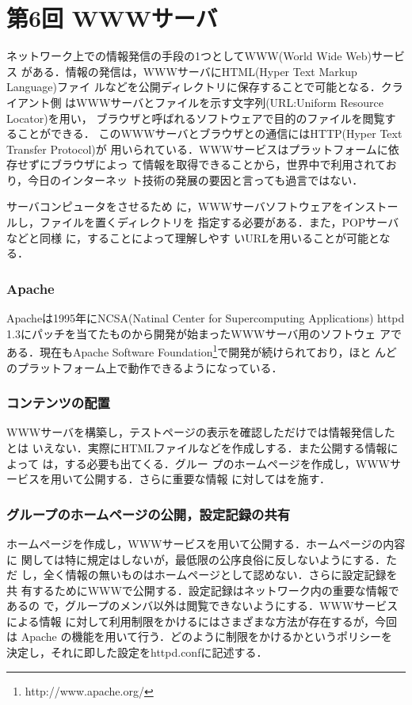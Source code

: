 \section{第6回 WWWサーバ}

ネットワーク上での情報発信の手段の1つとしてWWW(World Wide Web)サービス
がある．情報の発信は，WWWサーバにHTML(Hyper Text Markup Language)ファイ
ルなどを公開ディレクトリに保存することで可能となる．クライアント側
はWWWサーバとファイルを示す文字列(URL:Uniform Resource Locator)を用い，
ブラウザと呼ばれるソフトウェアで目的のファイルを閲覧することができる．
このWWWサーバとブラウザとの通信にはHTTP(Hyper Text Transfer Protocol)が
用いられている．WWWサービスはプラットフォームに依存せずにブラウザによっ
て情報を取得できることから，世界中で利用されており，今日のインターネッ
ト技術の発展の要因と言っても過言ではない．

サーバコンピュータを\textbf{}させるため
に，WWWサーバソフトウェアをインストールし，ファイルを置くディレクトリを
指定する必要がある．また，POPサーバなどと同様
に，\textbf{}することによって理解しやす
いURLを用いることが可能となる．

\subsubsection*{Apache}
Apacheは1995年にNCSA(Natinal Center for Supercomputing Applications)
httpd 1.3にパッチを当てたものから開発が始まったWWWサーバ用のソフトウェ
アである．現在もApache Software
Foundation\footnote{http://www.apache.org/}で開発が続けられており，ほと
んどのプラットフォーム上で動作できるようになっている．

\subsubsection*{コンテンツの配置}
WWWサーバを構築し，テストページの表示を確認しただけでは情報発信したとは
いえない．実際にHTMLファイルなどを作成し\textbf{}する．また公開する情報によって
は，\textbf{}する必要も出てくる．グルー
プのホームページを作成し，WWWサービスを用いて公開する．さらに重要な情報
に対しては\textbf{}を施す．

\subsubsection*{グループのホームページの公開，設定記録の共有}
ホームページを作成し，WWWサービスを用いて公開する．ホームページの内容に
関しては特に規定はしないが，最低限の公序良俗に反しないようにする．ただ
し，全く情報の無いものはホームページとして認めない．さらに設定記録を共
有するためにWWWで公開する．設定記録はネットワーク内の重要な情報であるの
で，グループのメンバ以外は閲覧できないようにする．WWWサービスによる情報
に対して利用制限をかけるにはさまざまな方法が存在するが，今回
は Apache の機能を用いて行う．どのように制限をかけるかというポリシーを
決定し，それに即した設定をhttpd.confに記述する．

